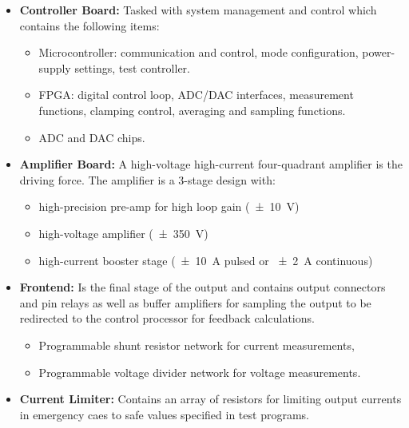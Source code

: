 \begin{itemize}[topsep=8pt,itemsep=4pt,partopsep=4pt, parsep=4pt]

    \item \textbf{Controller Board:} Tasked with system management and control
    which contains the following items:
    \begin{itemize}[topsep=8pt,itemsep=4pt,partopsep=4pt, parsep=4pt]
        \item Microcontroller: communication and control, mode configuration,
        power-supply settings, test controller.
        \item FPGA: digital control loop, ADC/DAC interfaces, measurement
        functions, clamping control, averaging and sampling functions.
        \item \acs{ADC} and \acs{DAC} chips.
    \end{itemize}

    \item \textbf{Amplifier Board:} A high-voltage high-current four-quadrant
    amplifier is the driving force. The amplifier is a 3-stage design with:
    \begin{itemize}[topsep=8pt,itemsep=4pt,partopsep=4pt, parsep=4pt]
        \item {high-precision pre-amp for high loop gain (\SI{\pm10}{\volt})}
        \item {high-voltage amplifier (\SI{\pm350}{\volt})}
        \item {high-current booster stage (\SI{\pm10}{\ampere} pulsed or \SI{\pm2}{\ampere} continuous)}
    \end{itemize}

    \item \textbf{Frontend:} Is the final stage of the output and
    contains output connectors and pin relays as well as buffer amplifiers for
    sampling the output to be redirected to the control processor for feedback
    calculations.
    \begin{itemize}[topsep=8pt,itemsep=4pt,partopsep=4pt, parsep=4pt]
        \item {Programmable shunt resistor network for current measurements,}
        \item {Programmable voltage divider network for voltage measurements.}
    \end{itemize}

    \item \textbf{Current Limiter:} Contains an array of resistors for limiting
    output currents in emergency caes to safe values specified in test programs.


\end{itemize}

